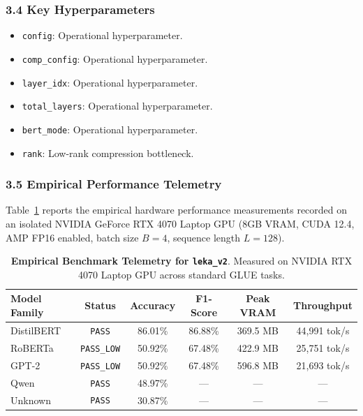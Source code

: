 \subsubsection*{3.4 Key Hyperparameters}
\begin{itemize}
    \item \texttt{config}: Operational hyperparameter.
    \item \texttt{comp\_config}: Operational hyperparameter.
    \item \texttt{layer\_idx}: Operational hyperparameter.
    \item \texttt{total\_layers}: Operational hyperparameter.
    \item \texttt{bert\_mode}: Operational hyperparameter.
    \item \texttt{rank}: Low-rank compression bottleneck.
\end{itemize}

\subsubsection*{3.5 Empirical Performance Telemetry}
Table~\ref{tab:telemetry_leka_v2} reports the empirical hardware performance measurements recorded on an isolated NVIDIA GeForce RTX 4070 Laptop GPU (8GB VRAM, CUDA 12.4, AMP FP16 enabled, batch size $B=4$, sequence length $L=128$).

\begin{table}[h]
\centering
\small
\caption{\textbf{Empirical Benchmark Telemetry for \texttt{leka\_v2}}. Measured on NVIDIA RTX 4070 Laptop GPU across standard GLUE tasks.}
\label{tab:telemetry_leka_v2}
\begin{tabular*}{\columnwidth}{@{\extracolsep{\fill}}lccccc}
\toprule
\textbf{Model Family} & \textbf{Status} & \textbf{Accuracy} & \textbf{F1-Score} & \textbf{Peak VRAM} & \textbf{Throughput} \\
\midrule
DistilBERT & \texttt{PASS} & 86.01\% & 86.88\% & 369.5 MB & 44,991 tok/s \\
RoBERTa & \texttt{PASS\_LOW} & 50.92\% & 67.48\% & 422.9 MB & 25,751 tok/s \\
GPT-2 & \texttt{PASS\_LOW} & 50.92\% & 67.48\% & 596.8 MB & 21,693 tok/s \\
Qwen & \texttt{PASS} & 48.97\% & --- & --- & --- \\
Unknown & \texttt{PASS} & 30.87\% & --- & --- & --- \\
\bottomrule
\end{tabular*}
\end{table}

